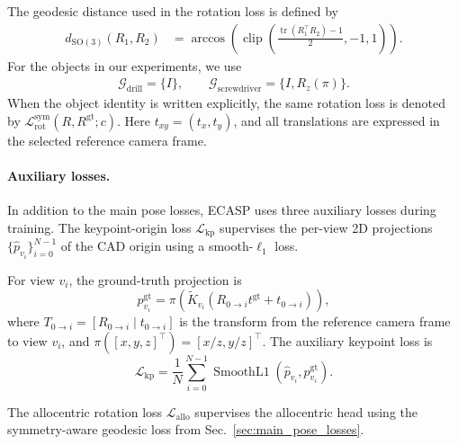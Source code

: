 
The geodesic distance used in the rotation loss is defined by
\[
\begin{aligned}
d_{\mathrm{SO}(3)}(R_1,R_2) &=
\arccos
\left(
\operatorname{clip}
\left(
\frac{\operatorname{tr}(R_1^{\top}R_2)-1}{2},
-1,1
\right)
\right).
\end{aligned}
\]
For the objects in our experiments, we use
\[
\begin{aligned}
\mathcal{G}_{\mathrm{drill}}=\{I\}, \qquad
\mathcal{G}_{\mathrm{screwdriver}}=\{I,R_z(\pi)\}.
\end{aligned}
\]
When the object identity is written explicitly, the same rotation loss is
denoted by \(\mathcal{L}_{\mathrm{rot}}^{\mathrm{sym}}(R,R^{\mathrm{gt}};c)\).
Here \(t_{xy}=(t_x,t_y)\), and all translations are expressed in the
selected reference camera frame.

\paragraph{Auxiliary losses.}
In addition to the main pose losses, ECASP uses three auxiliary losses during training.
The keypoint-origin loss \(\mathcal{L}_{\mathrm{kp}}\) supervises the per-view 2D projections \(\{\hat{p}_{v_i}\}_{i=0}^{N-1}\) of the CAD origin using a smooth-\(\ell_1\) loss.

For view \(v_i\), the ground-truth projection is
\[
p^{\mathrm{gt}}_{v_i}
=
\pi
\left(
\tilde{K}_{v_i}
\left(
R_{0\rightarrow i}t^{\mathrm{gt}}+t_{0\rightarrow i}
\right)
\right),
\]
where \(T_{0\rightarrow i}=[R_{0\rightarrow i}\mid t_{0\rightarrow i}]\)
is the transform from the reference camera frame to view \(v_i\), and
\(\pi([x,y,z]^\top)=[x/z,y/z]^\top\). The auxiliary keypoint loss is
\[
\mathcal{L}_{\mathrm{kp}}
=
\frac{1}{N}
\sum_{i=0}^{N-1}
\operatorname{SmoothL1}
\left(
\hat{p}_{v_i},p^{\mathrm{gt}}_{v_i}
\right).
\]

The allocentric rotation loss \(\mathcal{L}_{\mathrm{allo}}\) supervises the allocentric head using the symmetry-aware geodesic loss from Sec.~\ref{sec:main_pose_losses}.


